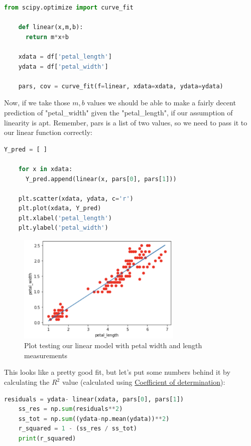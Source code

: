 \documentclass[12pt]{article}
\begin{document}
\begin{lstlisting}[language=Python]
    from scipy.optimize import curve_fit

    def linear(x,m,b):
      return m*x+b
    
    xdata = df['petal_length']
    ydata = df['petal_width']
    
    pars, cov = curve_fit(f=linear, xdata=xdata, ydata=ydata)
\end{lstlisting}

Now, if we take those $m,b$ values we should be able to make a fairly decent prediction of "petal\_width" given the "petal\_length", if our assumption of linearity is apt. Remember, pars is a list of two values, so we need to pass it to our linear function correctly:

\begin{lstlisting}[language=Python]
    Y_pred = [ ]

    for x in xdata:
      Y_pred.append(linear(x, pars[0], pars[1]))
    
    plt.scatter(xdata, ydata, c='r')
    plt.plot(xdata, Y_pred)
    plt.xlabel('petal_length')
    plt.ylabel('petal_width')
\end{lstlisting}

\begin{figure}[!h]
    \centering
    \includegraphics[width=0.7\textwidth]{figures/ssIM6.png}
    \caption{Plot testing our linear model with petal width and length measurements}
\end{figure}

This looks like a pretty good fit, but let's put some numbers behind it by calculating the $R^2$ value (calculated using \href{https://en.wikipedia.org/wiki/Coefficient_of_determination}{Coefficient of determination}):

\begin{lstlisting}[language=Python]
    residuals = ydata- linear(xdata, pars[0], pars[1])
    ss_res = np.sum(residuals**2)
    ss_tot = np.sum((ydata-np.mean(ydata))**2)
    r_squared = 1 - (ss_res / ss_tot)
    print(r_squared)
\end{lstlisting}
\end{document}
